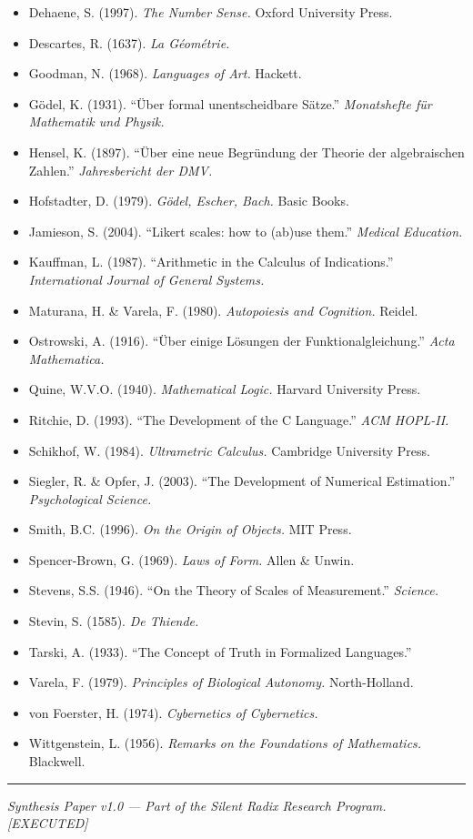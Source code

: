 \documentclass[
]{article}
\providecommand{\tightlist}{%
  \setlength{\itemsep}{0pt}\setlength{\parskip}{0pt}}
\begin{document}
\begin{itemize}
\tightlist
\item
  Dehaene, S. (1997). \emph{The Number Sense.} Oxford University Press.
\item
  Descartes, R. (1637). \emph{La Géométrie.}
\item
  Goodman, N. (1968). \emph{Languages of Art.} Hackett.
\item
  Gödel, K. (1931). ``Über formal unentscheidbare Sätze.''
  \emph{Monatshefte für Mathematik und Physik.}
\item
  Hensel, K. (1897). ``Über eine neue Begründung der Theorie der
  algebraischen Zahlen.'' \emph{Jahresbericht der DMV.}
\item
  Hofstadter, D. (1979). \emph{Gödel, Escher, Bach.} Basic Books.
\item
  Jamieson, S. (2004). ``Likert scales: how to (ab)use them.''
  \emph{Medical Education.}
\item
  Kauffman, L. (1987). ``Arithmetic in the Calculus of Indications.''
  \emph{International Journal of General Systems.}
\item
  Maturana, H. \& Varela, F. (1980). \emph{Autopoiesis and Cognition.}
  Reidel.
\item
  Ostrowski, A. (1916). ``Über einige Lösungen der
  Funktionalgleichung.'' \emph{Acta Mathematica.}
\item
  Quine, W.V.O. (1940). \emph{Mathematical Logic.} Harvard University
  Press.
\item
  Ritchie, D. (1993). ``The Development of the C Language.'' \emph{ACM
  HOPL-II.}
\item
  Schikhof, W. (1984). \emph{Ultrametric Calculus.} Cambridge University
  Press.
\item
  Siegler, R. \& Opfer, J. (2003). ``The Development of Numerical
  Estimation.'' \emph{Psychological Science.}
\item
  Smith, B.C. (1996). \emph{On the Origin of Objects.} MIT Press.
\item
  Spencer-Brown, G. (1969). \emph{Laws of Form.} Allen \& Unwin.
\item
  Stevens, S.S. (1946). ``On the Theory of Scales of Measurement.''
  \emph{Science.}
\item
  Stevin, S. (1585). \emph{De Thiende.}
\item
  Tarski, A. (1933). ``The Concept of Truth in Formalized Languages.''
\item
  Varela, F. (1979). \emph{Principles of Biological Autonomy.}
  North-Holland.
\item
  von Foerster, H. (1974). \emph{Cybernetics of Cybernetics.}
\item
  Wittgenstein, L. (1956). \emph{Remarks on the Foundations of
  Mathematics.} Blackwell.
\end{itemize}

\begin{center}\rule{0.5\linewidth}{0.5pt}\end{center}

\emph{Synthesis Paper v1.0 --- Part of the Silent Radix Research
Program. {[}EXECUTED{]}}
\end{document}
